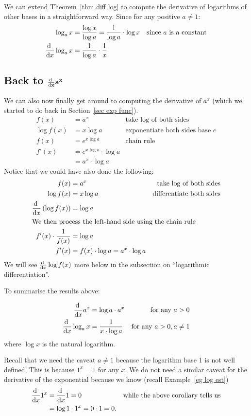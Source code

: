 We can extend Theorem~\ref{thm diff log} to compute the derivative of
logarithms of other bases in a straightforward way. Since for any positive $a
\neq 1$:
\begin{align*}
  \log_a x &= \frac{\log x}{\log a} = \frac{1}{\log a} \cdot \log x &
\text{since $a$ is a constant}\\
  \diff{}{x} \log_a x &= \frac{1}{\log a} \cdot \frac{1}{x}
\end{align*}

\subsection*{Back to $\mathbf{\diff{}{x} a^x}$}

We can also now finally get around to computing the derivative of $a^x$ (which
we started to do back in Section~\ref{sec exp func}).
\begin{align*}
  f(x) &= a^x & \text{take log of both sides}\\
  \log f(x) &= x \log a & \text{exponentiate both sides base $e$}\\
  f(x) &= e^{x \log a} & \text{chain rule}\\
  f'(x) &= e^{x \log a} \cdot \log a \\
  &= a^x \cdot \log a
\end{align*}
Notice that we could have also done the following:
\begin{align*}
  f(x) &= a^x & \text{take log of both sides} \\
  \log f(x) &= x \log a & \text{differentiate both sides}\\
  \diff{}{x} \left( \log f(x) \right) &=
\log a \\
\intertext{We then process the left-hand side using the chain rule}
  f'(x) \cdot \frac{1}{f(x)} &= \log a \\
  f'(x) &= f(x) \cdot \log a = a^x \cdot \log a
\end{align*}
We will see $\diff{}{x} \log f(x)$ more below in the subsection on
``logarithmic differentiation''.

To summarise the results above:
\begin{cor}
\begin{align*}
  \diff{}{x} a^x &= \log a \cdot a^x & \text{for any $a>0$}\\
  \diff{}{x} \log_a x &= \frac{1}{x \cdot \log a} & \text{for any $a>0,
a \neq 1$}
\end{align*}
where $\log x$ is the natural logarithm.
\end{cor}
Recall that we need the caveat $a \neq 1$ because the logarithm base 1 is not
well defined. This is because $1^x = 1$ for any $x$. We do not need a similar
caveat for the derivative of the exponential because we know (recall
Example~\ref{eg log est})
\begin{align*}
  \diff{}{x} 1^x &= \diff{}{x} 1= 0 &\text{while the above corollary tells us}\\
  &= \log 1 \cdot 1^x = 0 \cdot 1 = 0.
\end{align*}

